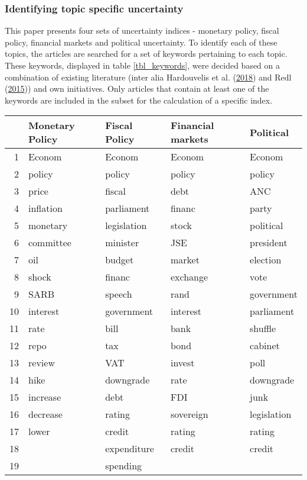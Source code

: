 \documentclass[11pt,preprint, authoryear]{elsarticle}
\let\origtable\table
\let\endorigtable\endtable
\renewenvironment{table}[1][2] {
    \expandafter\origtable\expandafter[H]
} {
    \endorigtable
}
\numberwithin{equation}{section}
\numberwithin{figure}{section}
\numberwithin{table}{section}
\begin{document}
\subsubsection{\texorpdfstring{Identifying topic specific uncertainty
\label{ss_topics}}{Identifying topic specific uncertainty }}\label{identifying-topic-specific-uncertainty}

This paper presents four sets of uncertainty indices - monetary policy,
fiscal policy, financial markets and political uncertainty. To identify
each of these topics, the articles are searched for a set of keywords
pertaining to each topic. These keywords, displayed in table
\ref{tbl_keywords}, were decided based on a combination of existing
literature (inter alia Hardouvelis et al.
(\protect\hyperlink{ref-Hardouvelis2018}{2018}) and Redl
(\protect\hyperlink{ref-Redl2015}{2015})) and own initiatives. Only
articles that contain at least one of the keywords are included in the
subset for the calculation of a specific index.

\begin{table}[H]
\caption{Keywords per Index category \label{tbl_keywords}} 
\centering
\begin{tabular}{rllll}
  \hline
 & Monetary Policy & Fiscal Policy & Financial markets & Political \\ 
  \hline
1 & Econom & Econom & Econom & Econom \\ 
  2 & policy & policy & policy & policy \\ 
  3 & price & fiscal & debt & ANC \\ 
  4 & inflation & parliament & financ & party \\ 
  5 & monetary & legislation & stock & political \\ 
  6 & committee & minister & JSE & president \\ 
  7 & oil & budget & market & election \\ 
  8 & shock & financ & exchange & vote \\ 
  9 & SARB & speech & rand & government \\ 
  10 & interest & government & interest & parliament \\ 
  11 & rate & bill & bank & shuffle \\ 
  12 & repo & tax & bond & cabinet \\ 
  13 & review & VAT & invest & poll \\ 
  14 & hike & downgrade & rate & downgrade \\ 
  15 & increase & debt & FDI & junk \\ 
  16 & decrease & rating & sovereign & legislation \\ 
  17 & lower & credit & rating & rating \\ 
  18 &  & expenditure & credit & credit \\ 
  19 &  & spending &  &  \\ 
   \hline
\end{tabular}
\end{table}
\end{document}
